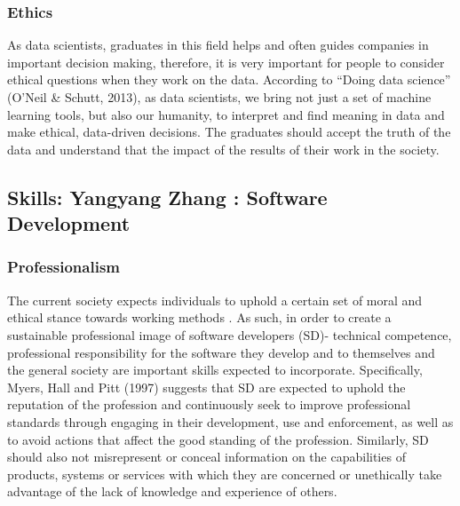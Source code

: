 \documentclass[a4paper, 11pt]{report}
\begin{document}
\subsubsection{Ethics}
As data scientists, graduates in this field helps and often guides companies in important decision making, therefore, it is very important for people to consider ethical questions when they work on the data. According to “Doing data science” (O’Neil \& Schutt, 2013), as data scientists, we bring not just a set of machine learning tools, but also our humanity, to interpret and find meaning in data and make ethical, data-driven decisions. The graduates should accept the truth of the data and understand that the impact of the results of their work in the society. 


\subsection{Skills: Yangyang Zhang : Software Development}

\subsubsection{Professionalism}
The current society expects individuals to uphold a certain set of moral and ethical stance towards working methods \cite{myers2012responsible}. As such, in order to create a sustainable professional image of software developers (SD)- technical competence, professional responsibility for the software they develop and to themselves and the general society are important skills expected to incorporate. Specifically, Myers, Hall and Pitt (1997) suggests that SD are expected to uphold the reputation of the profession and continuously seek to improve professional standards through engaging in their development, use and enforcement, as well as to avoid actions that affect the good standing of the profession. Similarly, SD should also not misrepresent or conceal information on the capabilities of products, systems or services with which they are concerned or unethically take advantage of the lack of knowledge and experience of others. 
 
\end{document}
